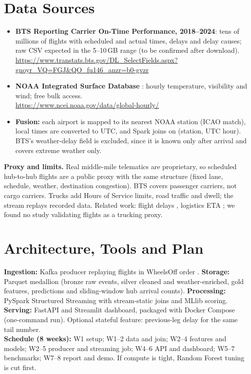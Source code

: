 \documentclass[10pt]{article}
\begin{document}
\section*{Data Sources}
\begin{itemize}
\item \textbf{BTS Reporting Carrier On-Time Performance, 2018--2024}: tens of millions of flights with scheduled and actual times, delays and delay causes; raw CSV expected in the 5--10\,GB range (to be confirmed after download).\\
\url{https://www.transtats.bts.gov/DL_SelectFields.aspx?gnoyr_VQ=FGJ&QO_fu146_anzr=b0-gvzr}
\item \textbf{NOAA Integrated Surface Database} \cite{isd}: hourly temperature, visibility and wind; free bulk access.\\
\url{https://www.ncei.noaa.gov/data/global-hourly/}
\item \textbf{Fusion:} each airport is mapped to its nearest NOAA station (ICAO match), local times are converted to UTC, and Spark joins on (station, UTC hour). BTS's weather-delay field is excluded, since it is known only after arrival and covers extreme weather only.
\end{itemize}
\textbf{Proxy and limits.} Real middle-mile telematics are proprietary, so scheduled hub-to-hub flights are a public proxy with the same structure (fixed lane, schedule, weather, destination congestion). BTS covers passenger carriers, not cargo carriers. Trucks add Hours of Service limits, road traffic and dwell; the stream replays recorded data. Related work: flight delays \cite{sternberg,beltman}, logistics ETA \cite{wani}; we found no study validating flights as a trucking proxy.

\section*{Architecture, Tools and Plan}
\textbf{Ingestion:} Kafka producer replaying flights in WheelsOff order \cite{kreps}. \textbf{Storage:} Parquet medallion (bronze raw events, silver cleaned and weather-enriched, gold features, predictions and sliding-window hub arrival counts). \textbf{Processing:} PySpark Structured Streaming \cite{armbrust} with stream-static joins and MLlib scoring. \textbf{Serving:} FastAPI and Streamlit dashboard, packaged with Docker Compose (one-command run). Optional stateful feature: previous-leg delay for the same tail number.\\
\textbf{Schedule (8 weeks):} W1 setup; W1--2 data and join; W2--4 features and models; W2--5 producer and streaming job; W4--6 API and dashboard; W5--7 benchmarks; W7--8 report and demo. If compute is tight, Random Forest tuning is cut first.
\end{document}
